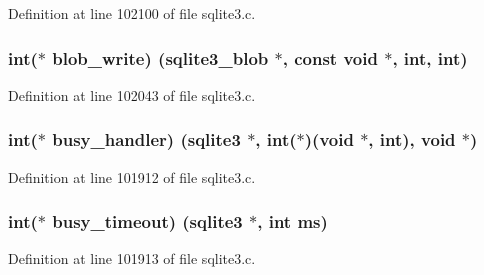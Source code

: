 Definition at line 102100 of file sqlite3.\+c.

\hypertarget{structsqlite3__api__routines_a839a00c8de419e217288953ed6e5944e}{}
\subsubsection[{blob\+\_\+write}]{\setlength{\rightskip}{0pt plus 5cm}int($\ast$ blob\+\_\+write) ({\bf sqlite3\+\_\+blob} $\ast$, const void $\ast$, int, int)}\label{structsqlite3__api__routines_a839a00c8de419e217288953ed6e5944e}


Definition at line 102043 of file sqlite3.\+c.

\hypertarget{structsqlite3__api__routines_a8050bb68d78bf3e6368042e37102bd36}{}
\subsubsection[{busy\+\_\+handler}]{\setlength{\rightskip}{0pt plus 5cm}int($\ast$ busy\+\_\+handler) ({\bf sqlite3} $\ast$, int($\ast$)(void $\ast$, int), void $\ast$)}\label{structsqlite3__api__routines_a8050bb68d78bf3e6368042e37102bd36}


Definition at line 101912 of file sqlite3.\+c.

\hypertarget{structsqlite3__api__routines_a6a89f6f95a1807a592fe8b74ebe5620b}{}
\subsubsection[{busy\+\_\+timeout}]{\setlength{\rightskip}{0pt plus 5cm}int($\ast$ busy\+\_\+timeout) ({\bf sqlite3} $\ast$, int ms)}\label{structsqlite3__api__routines_a6a89f6f95a1807a592fe8b74ebe5620b}


Definition at line 101913 of file sqlite3.\+c.

\hypertarget{structsqlite3__api__routines_a6acef5f8196481f86b71c60619468d23}{}
